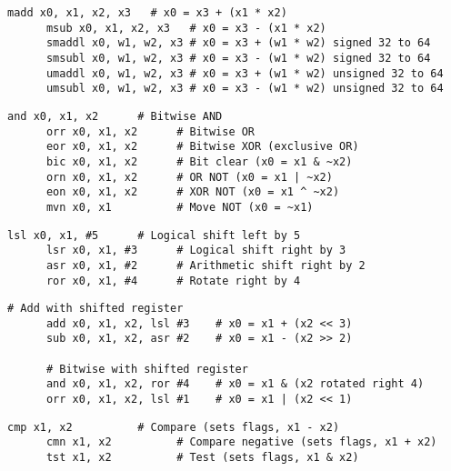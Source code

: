  \begin{definition}
    \begin{lstlisting}[language=arm]
      madd x0, x1, x2, x3   # x0 = x3 + (x1 * x2)
      msub x0, x1, x2, x3   # x0 = x3 - (x1 * x2)
      smaddl x0, w1, w2, x3 # x0 = x3 + (w1 * w2) signed 32 to 64
      smsubl x0, w1, w2, x3 # x0 = x3 - (w1 * w2) signed 32 to 64
      umaddl x0, w1, w2, x3 # x0 = x3 + (w1 * w2) unsigned 32 to 64
      umsubl x0, w1, w2, x3 # x0 = x3 - (w1 * w2) unsigned 32 to 64
    \end{lstlisting}
  \end{definition}

  \begin{definition}
    \begin{lstlisting}[language=arm]
      and x0, x1, x2      # Bitwise AND
      orr x0, x1, x2      # Bitwise OR
      eor x0, x1, x2      # Bitwise XOR (exclusive OR)
      bic x0, x1, x2      # Bit clear (x0 = x1 & ~x2)
      orn x0, x1, x2      # OR NOT (x0 = x1 | ~x2)
      eon x0, x1, x2      # XOR NOT (x0 = x1 ^ ~x2)
      mvn x0, x1          # Move NOT (x0 = ~x1)
    \end{lstlisting}
  \end{definition}

  \begin{definition}
    \begin{lstlisting}[language=arm]
      lsl x0, x1, #5      # Logical shift left by 5
      lsr x0, x1, #3      # Logical shift right by 3
      asr x0, x1, #2      # Arithmetic shift right by 2
      ror x0, x1, #4      # Rotate right by 4
    \end{lstlisting}
  \end{definition}

  \begin{definition}
    \begin{lstlisting}[language=arm]
      # Add with shifted register
      add x0, x1, x2, lsl #3    # x0 = x1 + (x2 << 3)
      sub x0, x1, x2, asr #2    # x0 = x1 - (x2 >> 2)
      
      # Bitwise with shifted register  
      and x0, x1, x2, ror #4    # x0 = x1 & (x2 rotated right 4)
      orr x0, x1, x2, lsl #1    # x0 = x1 | (x2 << 1)
    \end{lstlisting}
  \end{definition}

  \begin{definition}
    \begin{lstlisting}[language=arm]
      cmp x1, x2          # Compare (sets flags, x1 - x2)
      cmn x1, x2          # Compare negative (sets flags, x1 + x2)
      tst x1, x2          # Test (sets flags, x1 & x2)
    \end{lstlisting}
  \end{definition}

